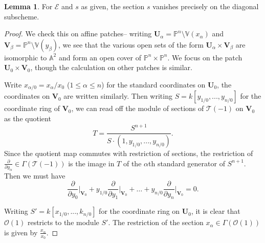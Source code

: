 \documentclass[a4paper]{article}
\theoremstyle{definition}
\newtheorem{lemma}[defn]{Lemma}
\theoremstyle{remark}
\newcommand{\Pn}{\ensuremath{{\mathbb{P}^n}}}
\begin{document}
\begin{lemma}\label{svanish}
    For \(\mathscr{E}\) and \(s\) as given, the section \(s\) vanishes precisely
    on the diagonal subscheme.
    \begin{proof}
        We check this on affine patches-- writing \(\mathbf{U}_\alpha=\Pn\setminus
        \mathbb{V}(x_\alpha)\) and \(\mathbf{V}_\beta = \Pn \setminus
        \mathbb{V}(y_\beta)\), we see that the various open
        sets of the form \(\mathbf{U}_\alpha\times
        \mathbf{V}_\beta\) are isomorphic to \(\mathbb{A}^2\) and form an open
        cover of \(\Pn\times \Pn\). We focus on the patch \(\mathbf{U}_0\times
        \mathbf{V}_0\), though the calculation on other patches is similar. 

        Write \(x_{\alpha/0}={x_\alpha}/{x_0}\) (\(1\leq \alpha \leq n\))
        for the standard coordinates on \(\mathbf{U}_0\), the coordinates on
        \(\mathbf{V}_0\) are written similarly. Then writing
        \(S=k[y_{1/0},...,y_{n/0}]\) for the coordinate ring
        of \(\mathbf{V}_0\), we can read off the module of sections of
        \(\mathscr{T}(-1)\) on \(\mathbf{V}_0\) as the quotient
        \[T = \frac{S^{n+1}}{S\cdot (1,y_{1/0},...,y_{n/0})}.\]
                Since the quotient map commutes with restriction of sections, the
        restriction of \(\frac{\partial}{\partial y_\alpha}\in
        \Gamma(\mathscr{T}(-1))\) is the image in \(T\) of the \(\alpha\)th standard
        generator of \(S^{n+1}\). Then we must have 
        \[\frac{\partial}{\partial y_0}\bigg|_{\mathbf{V}_0} +
        y_{1/0}\frac{\partial}{\partial y_1}\bigg|_{\mathbf{V}_0} + \dots +
        y_{n/0}\frac{\partial}{\partial y_n}\bigg|_{\mathbf{V}_0} = 0.\]

        Writing \(S' = k[x_{1/0},...,k_{n/0}]\) for the coordinate ring on
        \(\mathbf{U}_0\), it is clear that \(\mathscr{O}(1)\) restricts to the
        module \(S'\). The restriction of the section \(x_\alpha\in
        \Gamma(\mathscr{O}(1))\) is given by \(\frac{x_\alpha}{x_0}\).


\end{proof}
\end{lemma}
\end{document}
